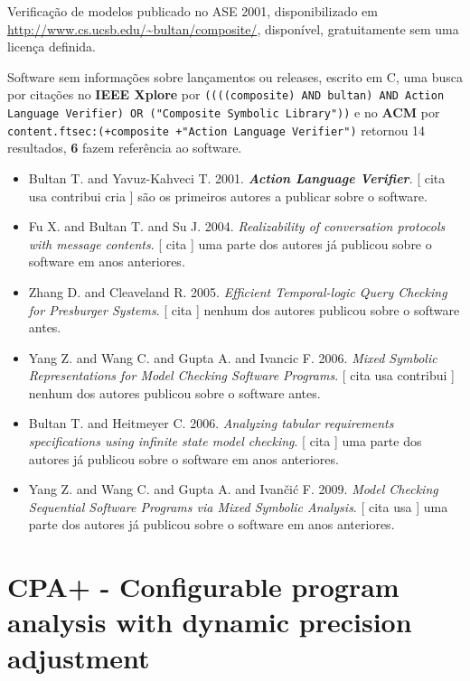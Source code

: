 Verificação de modelos
publicado no ASE 2001,
disponibilizado em \url{http://www.cs.ucsb.edu/~bultan/composite/},
disponível,
gratuitamente
sem uma licença definida.

Software sem informações sobre lançamentos ou releases,
escrito em C,
uma busca por citações no {\bf IEEE Xplore} por
\texttt{((((composite) AND bultan) AND Action Language Verifier) OR ("Composite Symbolic Library"))}
e no {\bf ACM} por
\texttt{content.ftsec:(+composite +"Action Language Verifier")}
retornou
14 resultados,
{\bf 6} fazem referência ao software.

\begin{itemize}
\item Bultan T. and Yavuz-Kahveci T.
      2001.
        \textbf{\textit{ Action Language Verifier}}.
      [
          cita
          usa
          contribui
          cria
      ]
são os primeiros autores a publicar sobre o software.
\item Fu X. and Bultan T. and Su J.
      2004.
        \textit{ Realizability of conversation protocols with message contents}.
      [
          cita
      ]
uma parte dos autores já publicou sobre o software em anos anteriores.
\item Zhang D. and Cleaveland R.
      2005.
        \textit{ Efficient Temporal-logic Query Checking for Presburger Systems}.
      [
          cita
      ]
nenhum dos autores publicou sobre o software antes.
\item Yang Z. and Wang C. and Gupta A. and Ivancic F.
      2006.
        \textit{ Mixed Symbolic Representations for Model Checking Software Programs}.
      [
          cita
          usa
          contribui
      ]
nenhum dos autores publicou sobre o software antes.
\item Bultan T. and Heitmeyer C.
      2006.
        \textit{ Analyzing tabular requirements specifications using infinite state model checking}.
      [
          cita
      ]
uma parte dos autores já publicou sobre o software em anos anteriores.
\item Yang Z. and Wang C. and Gupta A. and Ivan\v{c}i\'{c} F.
      2009.
        \textit{ Model Checking Sequential Software Programs via Mixed Symbolic Analysis}.
      [
          cita
          usa
      ]
uma parte dos autores já publicou sobre o software em anos anteriores.
\end{itemize}
\section{CPA+ - Configurable program analysis with dynamic precision adjustment}

